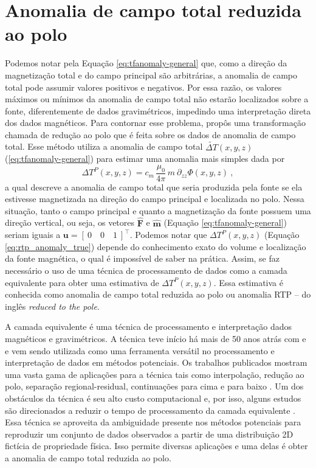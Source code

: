 \section{Anomalia de campo total reduzida ao polo}

Podemos notar pela Equação \ref{eq:tfanomaly-general} que, como a direção da magnetização total e do campo principal são arbitrárias, a anomalia de campo total pode assumir valores positivos e negativos. Por essa razão, os valores máximos ou mínimos da anomalia de campo total não estarão localizados sobre a fonte, diferentemente de dados gravimétricos, impedindo uma interpretação direta dos dados magnéticos. 
Para contornar esse problema, \citet{baranov1957} propôs uma transformação chamada de redução ao polo que é feita sobre os dados de anomalia de campo total.
Esse método utiliza a anomalia de campo total $\tilde{\Delta T}(x, y, z)$ (\ref{eq:tfanomaly-general}) para estimar uma anomalia mais simples dada por
\begin{equation}
\Delta T^{P}(x, y, z) = c_{m} \, \frac{\mu_{0}}{4\pi} \, m \: \partial_{zz} \Phi(x, y, z) \: ,
\label{eq:rtp_anomaly_true}
\end{equation}
a qual descreve a anomalia de campo total que seria produzida pela fonte se ela estivesse magnetizada na direção do campo principal e localizada no polo. Nessa situação, tanto o campo principal e quanto a magnetização da fonte possuem uma direção vertical, ou seja, os vetores $\hat{\mathbf{F}}$ e 
$\hat{\mathbf{m}}$ (Equação \ref{eq:tfanomaly-general}) 
seriam iguais a $\mathbf{u} = \left[\:0 \quad 0 \quad 1 \: \right]^{\top}$.
Podemos notar que  $\Delta T^{P}(x, y, z)$ (Equação \ref{eq:rtp_anomaly_true}) depende do conhecimento exato do volume e localização da fonte magnética, o qual é impossível de saber na prática. Assim, se faz necessário o uso de uma técnica de processamento de dados como a camada equivalente para obter uma estimativa de $ \Delta T^{P}(x, y, z) $.
Essa estimativa é conhecida como anomalia de campo total reduzida ao polo ou anomalia RTP -- do inglês \textit{reduced to the pole}.

A camada equivalente é uma técnica de processamento e interpretação dados magnéticos e gravimétricos. A técnica teve início há mais de 50 anos atrás com \cite{dampney_equivalent_1969} e \cite{emilia_equivalent_1973} e vem sendo utilizada como uma ferramenta versátil no processamento e interpretação de dados em métodos potenciais. Os trabalhos publicados mostram uma vasta gama de aplicações para a técnica tais como interpolação, redução ao polo, separação regional-residual, continuações para cima e para baixo \cite[por exemplo, ][]{mendonca1992,mendonca-silva1995,mendonca2004,macLennan-li2013,silva1986,li-li2014,hansen-miyazaki1984}. Um dos obstáculos da técnica é seu alto custo computacional e, por isso, alguns estudos são direcionados a reduzir o tempo de processamento da camada equivalente \cite[por exemplo ,][]{leao-silva1989,mendonca-silva1994,siqueira-etal2017,oliveirajr-etal2013, takahashi-2020,mendonca-2020,reis-2020}.
Essa técnica se aproveita da ambiguidade presente nos métodos potenciais para reproduzir um conjunto de dados observados a partir de uma distribuição 2D fictícia de propriedade física.
Isso permite diversas aplicações e uma delas é obter a  anomalia de campo total reduzida ao polo.